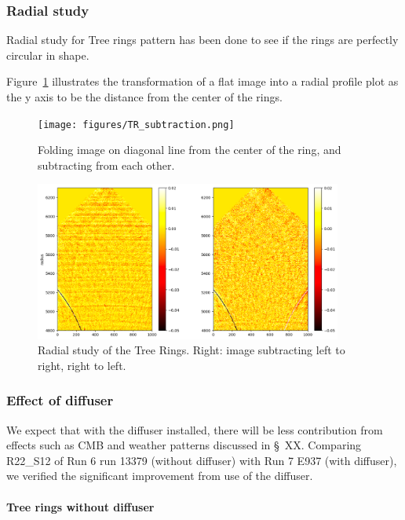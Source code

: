 \subsubsection{Radial study}
Radial study for Tree rings pattern has been done to see if the rings are perfectly circular in shape. 

Figure~\ref{fig:tree-ring-radial-transform} illustrates the transformation of a flat image into a radial profile plot as the y axis to be the distance from the center of the rings. 

\begin{figure}
\begin{centering}
\texttt{[image: figures/TR\_subtraction.png]}
\end{centering}
\caption{Folding image on diagonal line from the center of the ring, and subtracting from each other.}
\label{fig:tree-ring-radial-transform}
\end{figure}

\begin{figure}
\begin{centering}
\includegraphics[width=0.9\textwidth]{figures/TR_radial.png}
\end{centering}
\caption{Radial study of the Tree Rings. Right: image subtracting left to right, right to left.}
\end{figure}

\subsubsection{Effect of diffuser}
We expect that with the diffuser installed, there will be less contribution from effects such as CMB and weather patterns discussed in \S~XX. Comparing R22\_S12 of Run 6 run 13379 (without diffuser) with Run 7 E937 (with diffuser), we verified the significant improvement from use of the diffuser.
\paragraph{Tree rings without diffuser}

